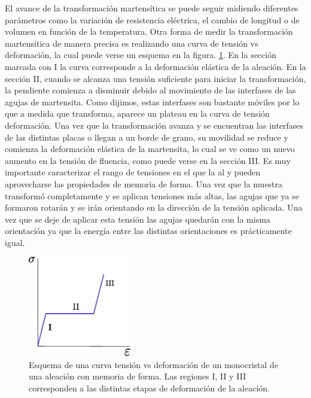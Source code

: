 \documentclass[a4paper,12pt,fleqn,twoside,openany]{book}
\begin{document}
El avance de la transformación martensítica se puede seguir midiendo diferentes parámetros como la variación de resistencia eléctrica, 
el cambio de longitud o de volumen en función de la temperatura. Otra forma de medir la transformación martensítica de manera precisa es realizando 
una curva de tensión vs deformación, la cual puede verse un esquema en la figura. \ref{fig:TensDefSMAMono}. En la sección marcada con I la curva 
corresponde a la deformación elástica de la aleación. En la sección II, cuando se alcanza una tensión 
suficiente para iniciar la transformación, la pendiente comienza a disminuir debido al movimiento de las interfases de las agujas de martensita. 
Como dijimos, estas interfases son bastante móviles por lo que a medida que transforma, aparece un plateau en la curva de tensión deformación. 
Una vez que la transformación avanza y se encuentran las interfases de las distintas placas o llegan a un borde de grano, su movilidad se reduce y 
comienza la deformación elástica de la martensita, lo cual se ve como un nuevo aumento en la tensión de fluencia, como puede verse en la sección III. 
 Es muy importante caracterizar el rango de tensiones en el que la al y pueden aprovecharse las propiedades de memoria de forma. Una vez que la muestra transformó completamente y se aplican tensiones más altas, las agujas que ya se formaron rotarán y se irán orientando en la dirección de la tensión aplicada. Una vez que se deje de aplicar esta tensión las agujas quedarán con la misma orientación ya que la energía entre las distintas orientaciones es prácticamente igual. 
 


\begin{figure}[h]
 \centering
 \includegraphics[width=0.4\textwidth]{Img/Introduccion/SigmavsDef.eps}
 \caption{Esquema de una curva tensión vs deformación de un monocristal de una aleación con memoria de forma. Las regiones I, II y III corresponden a las distintas etapas de deformación de la aleación.}
 \label{fig:TensDefSMAMono}
 \end{figure}
\end{document}
